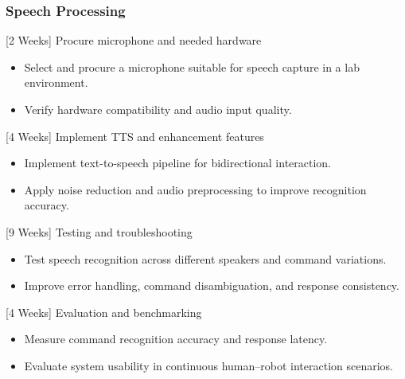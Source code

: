 \documentclass[12pt]{extarticle}
\begin{document}
\subsubsection{Speech Processing}
[2 Weeks] Procure microphone and needed hardware
\begin{itemize}
\item Select and procure a microphone suitable for speech capture in a lab environment.
\item Verify hardware compatibility and audio input quality.
\end{itemize}
[4 Weeks] Implement TTS and enhancement features
\begin{itemize}
\item Implement text-to-speech pipeline for bidirectional interaction.
\item Apply noise reduction and audio preprocessing to improve recognition accuracy.
\end{itemize}
[9 Weeks] Testing and troubleshooting
\begin{itemize}
\item Test speech recognition across different speakers and command variations.
\item Improve error handling, command disambiguation, and response consistency.
\end{itemize}
[4 Weeks] Evaluation and benchmarking
\begin{itemize}
\item Measure command recognition accuracy and response latency.
\item Evaluate system usability in continuous human–robot interaction scenarios.
\end{itemize}
\end{document}
